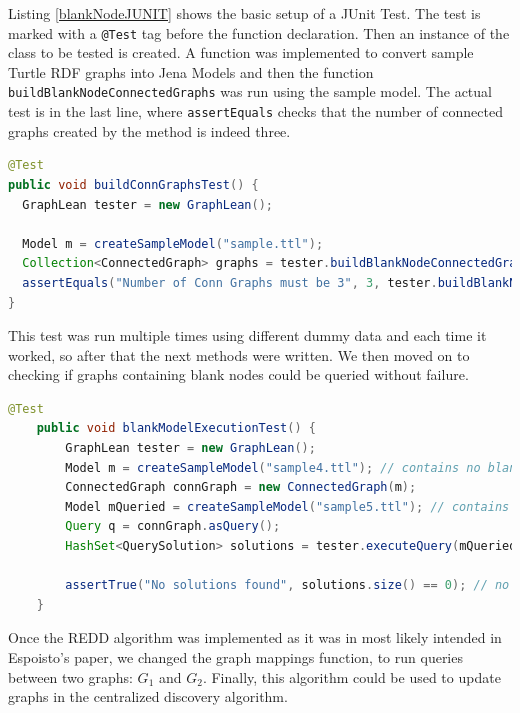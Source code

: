 Listing \ref{blankNodeJUNIT} shows the basic setup of a JUnit Test. The test is marked with a \texttt{@Test} tag before the function declaration. Then an instance of the class to be tested is created. A function was implemented to convert sample Turtle RDF graphs into Jena Models and then the function \texttt{buildBlankNodeConnectedGraphs} was run using the sample model. The actual test is in the last line, where \texttt{assertEquals} checks that the number of connected graphs created by the method is indeed three.

\begin{lstlisting}[language=JAVA, caption={A very trivial test, that checks the correct number of connected graphs in a sample graph is correct for the sample data, in this case sample.ttl contains 3 connected subgraphs.}, label={blankNodeJUNIT}]
@Test
public void buildConnGraphsTest() {
  GraphLean tester = new GraphLean();

  Model m = createSampleModel("sample.ttl");
  Collection<ConnectedGraph> graphs = tester.buildBlankNodeConnectedGraphs(m);
  assertEquals("Number of Conn Graphs must be 3", 3, tester.buildBlankNodeConnectedGraphs(m).size());
}
\end{lstlisting}

This test was run multiple times using different dummy data and each time it worked, so after that the next methods were written. We then moved on to checking if graphs containing blank nodes could be queried without failure.


\begin{lstlisting}[language=JAVA, caption={This test checks if a model containign blank nodes can be queried without returning an error.}]
@Test
	public void blankModelExecutionTest() {
		GraphLean tester = new GraphLean();
		Model m = createSampleModel("sample4.ttl"); // contains no blank nodes
		ConnectedGraph connGraph = new ConnectedGraph(m);
		Model mQueried = createSampleModel("sample5.ttl"); // contains blanks
		Query q = connGraph.asQuery();
		HashSet<QuerySolution> solutions = tester.executeQuery(mQueried, q);

		assertTrue("No solutions found", solutions.size() == 0); // no solutions expected
	}
\end{lstlisting}

Once the REDD algorithm was implemented as it was in most likely intended in Espoisto's paper, we changed the graph mappings function, to run queries between two graphs: $G_1$ and $G_2$. Finally, this algorithm could be used to update graphs in the centralized discovery algorithm.

